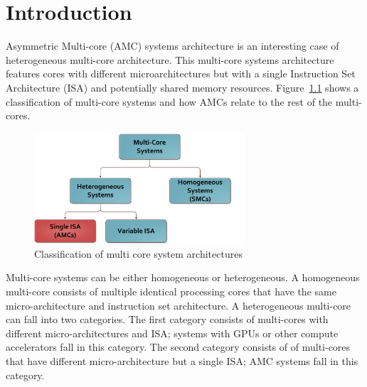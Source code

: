
\chapter{Introduction}
\label{chapter.introduction}

Asymmetric Multi-core (AMC) systems architecture is an interesting case of heterogeneous multi-core architecture. 
This multi-core systems architecture features cores with different microarchitectures but with a single Instruction Set Architecture (ISA) and potentially shared memory resources.
Figure~\ref{fig:heterogeneous_classification} shows a classification of multi-core systems and how AMCs relate to the rest of the multi-cores.
\begin{figure}[t]%
	\centering
	\includegraphics[width=0.7\textwidth]{figures/AMC_class.pdf}
	\caption{Classification of multi core system architectures}
	\label{fig:heterogeneous_classification}
\end{figure}
Multi-core systems can be either homogeneous or heterogeneous.
A homogeneous multi-core consists of multiple identical processing cores that have the same micro-architecture and instruction set architecture.
A heterogeneous multi-core can fall into two categories. 
The first category consists of multi-cores with different micro-architectures and ISA; systems with GPUs or other compute accelerators fall in this category.
The second category consists of of multi-cores that have different micro-architecture but a single ISA; AMC systems fall in this category.


